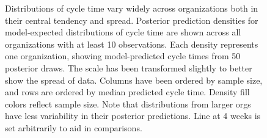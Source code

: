 \documentclass[manuscript,screen,review]{acmart}
\begin{document}
\begin{figure}


\caption[Distributions of cycle time vary widely across organizations
both in their central tendency and
spread]{\label{fig-pp-check-org}Distributions of cycle time vary widely
across organizations both in their central tendency and spread.
Posterior prediction densities for model-expected distributions of cycle
time are shown across all organizations with at least 10 observations.
Each density represents one organization, showing model-predicted cycle
times from 50 posterior draws. The scale has been transformed slightly
to better show the spread of data. Columns have been ordered by sample
size, and rows are ordered by median predicted cycle time. Density fill
colors reflect sample size. Note that distributions from larger orgs
have less variability in their posterior predictions. Line at 4 weeks is
set arbitrarily to aid in comparisons.}

\end{figure}%
\end{document}
